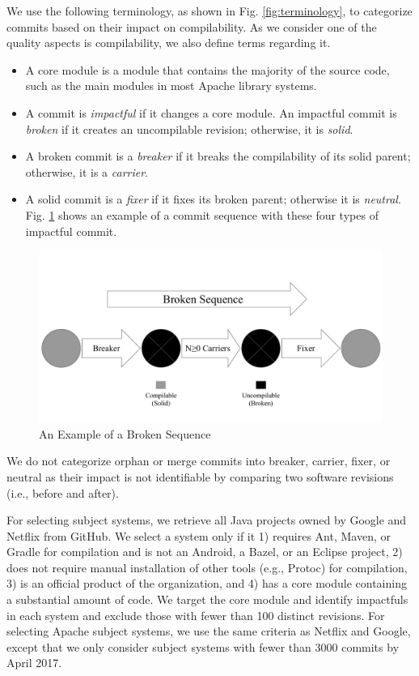 We use the following terminology, as shown in Fig. \ref{fig:terminology}, to categorize commits based on their impact on compilability. 
As we consider one of the quality aspects is compilability, we also define terms regarding it.

\begin{itemize}
\item A core module is a module that contains the majority of the source code, such as the main modules in most Apache library systems.
\item A commit is \textit{impactful} if it changes a core module.
An impactful commit is \textit{broken} if it creates an uncompilable revision; otherwise, it is \textit{solid}.
\item A broken commit is a \textit{breaker} if it breaks the compilability of its solid parent; otherwise, it is a \textit{carrier}.
\item A solid commit is a \textit{fixer} if it fixes its broken parent; otherwise it is \textit{neutral}.
Fig. \ref{fig:sequence} shows an example of a commit sequence with these four types of impactful commit.
\end{itemize}

\begin{figure}[htbp]
    \centerline{\includegraphics[scale=0.3]{figures/sequence.pdf}}
    \caption{An Example of a Broken Sequence}
    \label{fig:sequence}
    \end{figure}

We do not categorize orphan or merge commits into breaker, carrier, fixer, or neutral as their impact is not identifiable by comparing two software revisions (i.e., before and after).

For selecting subject systems, we retrieve all Java projects owned by Google and Netflix from GitHub.
We select a system only if it 1) requires Ant, Maven, or Gradle for compilation and is not an Android, a Bazel, or an Eclipse project, 2) does not require manual installation of other tools (e.g., Protoc) for compilation, 3) is an official product of the organization, and 4) has a core module containing a substantial amount of code.
We target the core module and identify impactfuls in each system and exclude those with fewer than 100 distinct revisions.
For selecting Apache subject systems, we use the same criteria as Netflix and Google, except that we only consider subject systems with fewer than 3000 commits by April 2017.

